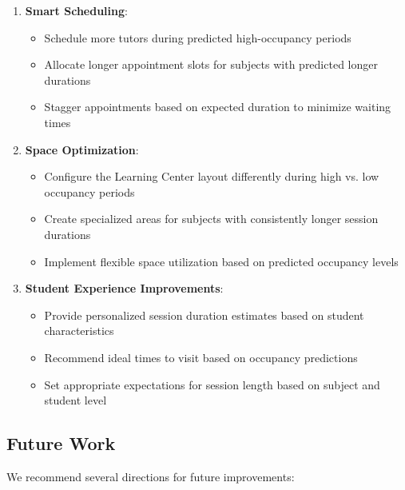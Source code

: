 \documentclass[12pt,letterpaper]{article}
\begin{document}
\begin{enumerate}
    \item \textbf{Smart Scheduling}:
    \begin{itemize}
        \item Schedule more tutors during predicted high-occupancy periods
        \item Allocate longer appointment slots for subjects with predicted longer durations
        \item Stagger appointments based on expected duration to minimize waiting times
    \end{itemize}

    \item \textbf{Space Optimization}:
    \begin{itemize}
        \item Configure the Learning Center layout differently during high vs. low occupancy periods
        \item Create specialized areas for subjects with consistently longer session durations
        \item Implement flexible space utilization based on predicted occupancy levels
    \end{itemize}

    \item \textbf{Student Experience Improvements}:
    \begin{itemize}
        \item Provide personalized session duration estimates based on student characteristics
        \item Recommend ideal times to visit based on occupancy predictions
        \item Set appropriate expectations for session length based on subject and student level
    \end{itemize}
\end{enumerate}

\subsection{Future Work}

We recommend several directions for future improvements:
\end{document}
